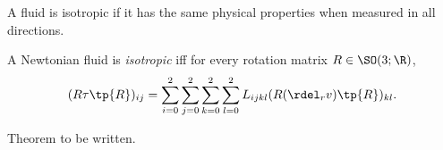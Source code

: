 \begin{rk}
A fluid is isotropic if it has the same physical properties when measured
in all directions.
\end{rk}

\begin{df}
    A Newtonian fluid is \emph{isotropic} iff for every rotation matrix $R\in \SO(3;\R)$,
    \begin{equation}
        (R\tau \tp{R})_{ij} = \sum_{i=0}^2 \sum_{j=0}^2 \sum_{k=0}^2 \sum_{l=0}^2 L_{ijkl} (R(\rdel_r v)\tp{R})_{kl}.
    \end{equation}
\end{df}

\begin{thm}
Theorem to be written.
\end{thm}
